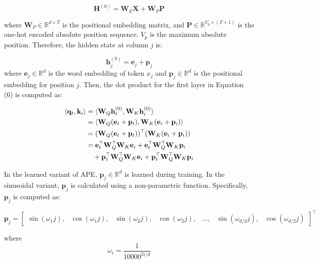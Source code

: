 \begin{equation}
\mathbf{H}^{(0)} = \mathbf{W}_E \mathbf{X} + \mathbf{W}_P \mathbf{P}
\end{equation}

where $\mathbf{W}_P \in \mathbb{R}^{d \times T}$ is the positional embedding matrix, and $\mathbf{P} \in \mathbb{R}^{V_p \times (T + 1)}$ is the one-hot encoded absolute position sequence. $V_p$ is the maximum absolute position. Therefore, the hidden state at column $j$ is:

\begin{equation}
\mathbf{h}^{(0)}_j = \mathbf{e}_j + \mathbf{p}_j
\end{equation}
where $\mathbf{e}_j \in \mathbb{R}^d$ is the word embedding of token $x_j$ and $\mathbf{p}_j \in \mathbb{R}^d$ is the positional embedding for position $j$. Then, the dot product for the first layer in Equation (6) is computed as:

\begin{align}
\langle \mathbf{q}_t, \mathbf{k}_i \rangle 
&= \langle \mathbf{W}_Q \mathbf{h}^{(0)}_t, \mathbf{W}_K \mathbf{h}^{(0)}_i \rangle \\
&= \langle \mathbf{W}_Q (\mathbf{e}_t + \mathbf{p}_t), \mathbf{W}_K (\mathbf{e}_i + \mathbf{p}_i) \rangle \\
&= (\mathbf{W}_Q (\mathbf{e}_t + \mathbf{p}_t))^\top (\mathbf{W}_K (\mathbf{e}_i + \mathbf{p}_i)) \\
&= \mathbf{e}_t^\top \mathbf{W}_Q^\top \mathbf{W}_K \mathbf{e}_i 
+ \mathbf{e}_t^\top \mathbf{W}_Q^\top \mathbf{W}_K \mathbf{p}_i \notag \\
&\quad + \mathbf{p}_t^\top \mathbf{W}_Q^\top \mathbf{W}_K \mathbf{e}_i 
+ \mathbf{p}_t^\top \mathbf{W}_Q^\top \mathbf{W}_K \mathbf{p}_i
\end{align}

In the learned variant of APE, $\mathbf{p}_j \in \mathbb{R}^d$ is learned during training. In the sinusoidal variant, $\mathbf{p}_j$ is calculated using a non-parametric function. Specifically, $\mathbf{p}_j$ is computed as:

\begin{equation}
\mathbf{p}_j = 
\begin{bmatrix}
\sin(\omega_1 j), & \cos(\omega_1 j), & \sin(\omega_2 j), & \cos(\omega_2 j), & \ldots, & \sin(\omega_{d/2} j), & \cos(\omega_{d/2} j)
\end{bmatrix}^\top
\end{equation}

where 
\begin{equation}
\omega_i = \frac{1}{10000^{2i/d}}
\end{equation}

